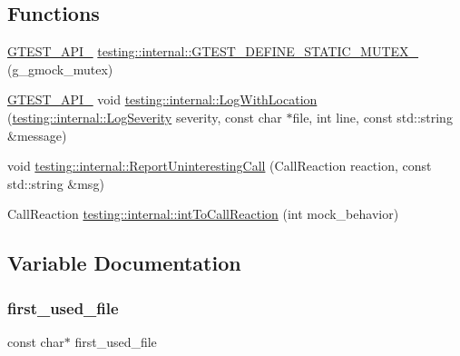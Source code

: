 \subsection*{Functions}
\begin{DoxyCompactItemize}
\item 
\mbox{\hyperlink{_obj__test_2lib_2googletest-release-1_88_81_2googletest_2include_2gtest_2internal_2gtest-port_8h_aa73be6f0ba4a7456180a94904ce17790}{G\+T\+E\+S\+T\+\_\+\+A\+P\+I\+\_\+}} \mbox{\hyperlink{namespacetesting_1_1internal_a8c4aa7be8daa7b60e293071d70a89584}{testing\+::internal\+::\+G\+T\+E\+S\+T\+\_\+\+D\+E\+F\+I\+N\+E\+\_\+\+S\+T\+A\+T\+I\+C\+\_\+\+M\+U\+T\+E\+X\+\_\+}} (g\+\_\+gmock\+\_\+mutex)
\item 
\mbox{\hyperlink{_obj__test_2lib_2googletest-release-1_88_81_2googletest_2include_2gtest_2internal_2gtest-port_8h_aa73be6f0ba4a7456180a94904ce17790}{G\+T\+E\+S\+T\+\_\+\+A\+P\+I\+\_\+}} void \mbox{\hyperlink{namespacetesting_1_1internal_a07f4411f23f8b1b731858be9dda3fdcc}{testing\+::internal\+::\+Log\+With\+Location}} (\mbox{\hyperlink{namespacetesting_1_1internal_a203d1a8a2147a53d12bbdae40d443914}{testing\+::internal\+::\+Log\+Severity}} severity, const char $\ast$file, int line, const std\+::string \&message)
\item 
void \mbox{\hyperlink{namespacetesting_1_1internal_af045b703d8487374620a8106a76814ee}{testing\+::internal\+::\+Report\+Uninteresting\+Call}} (Call\+Reaction reaction, const std\+::string \&msg)
\item 
Call\+Reaction \mbox{\hyperlink{namespacetesting_1_1internal_a55ce2ee38c64db1a89feae3751439620}{testing\+::internal\+::int\+To\+Call\+Reaction}} (int mock\+\_\+behavior)
\end{DoxyCompactItemize}


\subsection{Variable Documentation}
\mbox{\label{_obj__test_2lib_2googletest-master_2googlemock_2src_2gmock-spec-builders_8cc_a8eedfa563d9488da77e2972262a6adda}} 
\subsubsection{\texorpdfstring{first\_used\_file}{first\_used\_file}}
{\footnotesize\ttfamily const char$\ast$ first\+\_\+used\+\_\+file}

